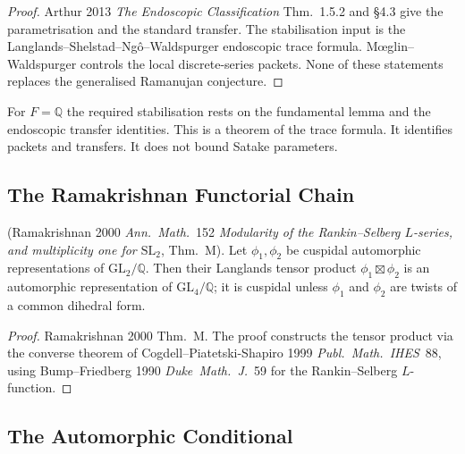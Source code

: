 \begin{proof}
Arthur 2013 \emph{The Endoscopic Classification} Thm.~1.5.2 and
\S4.3 give the parametrisation and the standard transfer. The
stabilisation input is the Langlands--Shelstad--Ng\^o--Waldspurger
endoscopic trace formula. M\oe glin--Waldspurger controls the
local discrete-series packets. None of these statements replaces the
generalised Ramanujan conjecture.
\end{proof}

\begin{remark}
\label{v4-arith:w10-c:rem:arthur-SCF-form}
For \(F=\mathbb{Q}\) the required stabilisation rests on the fundamental
lemma and the endoscopic transfer identities. This is a theorem of the
trace formula. It identifies packets and transfers. It does not bound
Satake parameters.
\end{remark}

\subsection{The Ramakrishnan Functorial Chain}
\label{v4-arith:w10-c:construction-D:ramakrishnan}

\begin{proposition}
\label{v4-arith:w10-c:prop:ramakrishnan}
\ClaimStatusProvedElsewhere (Ramakrishnan 2000
\emph{Ann.~Math.}~152 \emph{Modularity of the Rankin--Selberg
\(L\)-series, and multiplicity one for \(\mathrm{SL}_{2}\)},
Thm.~M). Let \(\phi_{1},\phi_{2}\) be cuspidal automorphic
representations of \(\mathrm{GL}_{2}/\mathbb{Q}\). Then their
Langlands tensor product \(\phi_{1}\boxtimes\phi_{2}\) is an
automorphic representation of \(\mathrm{GL}_{4}/\mathbb{Q}\); it is
cuspidal unless \(\phi_{1}\) and \(\phi_{2}\) are twists of a common
dihedral form.
\end{proposition}

\begin{proof}
Ramakrishnan 2000 Thm.~M. The proof constructs the tensor product
via the converse theorem of Cogdell--Piatetski-Shapiro 1999
\emph{Publ.~Math.~IHES}~88, using Bump--Friedberg 1990
\emph{Duke~Math.~J.}~59 for the Rankin--Selberg \(L\)-function.
\end{proof}

\subsection{The Automorphic Conditional}
\label{v4-arith:w10-c:construction-D:sub-RH}

